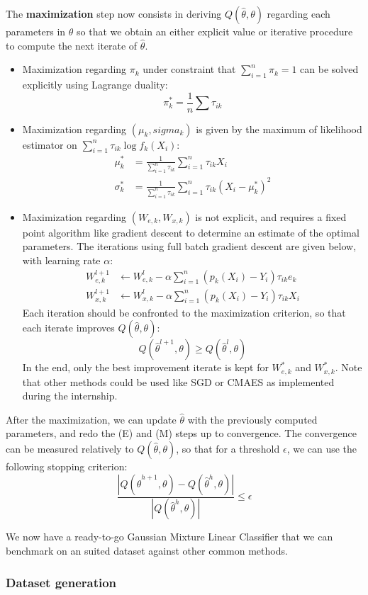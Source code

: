 The \textbf{maximization} step now consists in deriving $Q(\widehat{\theta}, \theta)$ regarding each parameters in $\theta$
so that we obtain an either explicit value or iterative procedure to compute the next iterate of $\widehat{\theta}$.
\begin{itemize}
    \item Maximization regarding $\pi_k$ under constraint that $\sum_{i=1}^n \pi_k = 1$ can be solved explicitly using Lagrange duality:
          $$
          \pi_k^* = \frac{1}{n} \sum \tau_{ik}
          $$
    \item Maximization regarding $(\mu_k, sigma_k)$ is given by the maximum of likelihood estimator on $\sum_{i=1}^n \tau_{ik} \log f_{k}(X_i)$:
          $$
          \begin{align}
              \mu_k^* &= \frac{1}{\sum_{i=1}^n \tau_{ik}} \sum_{i=1}^n \tau_{ik} X_i \\
              \sigma_k^* &= \frac{1}{\sum_{i=1}^n \tau_{ik}} \sum_{i=1}^n \tau_{ik} (X_i - \mu_k^*)^2
          \end{align}
          $$
    \item Maximization regarding $(W_{e,k}, W_{x,k})$ is not explicit, and requires a fixed point algorithm like gradient descent to determine an estimate of the optimal parameters.
          The iterations using full batch gradient descent are given below, with learning rate $\alpha$:
            $$
            \begin{align}
                W_{e,k}^{l+1} &\leftarrow W_{e,k}^{l} - \alpha \sum_{i=1}^n (p_k(X_i) - Y_i) \tau_{ik} e_k \\
                W_{x,k}^{l+1} &\leftarrow  W_{x,k}^{l} - \alpha \sum_{i=1}^n (p_k(X_i) - Y_i) \tau_{ik} X_i
            \end{align}
            $$
          Each iteration should be confronted to the maximization criterion, so that each iterate improves $Q(\widehat{\theta}, \theta)$:
          $$
          Q(\widehat{\theta}^{l+1}, \theta) \geq Q(\widehat{\theta}^{l}, \theta)
          $$
          In the end, only the best improvement iterate is kept for $W_{e,k}^*$ and $W_{x,k}^*$. Note that other methods could be used like SGD or CMAES as implemented during the internship.
\end{itemize}

After the maximization, we can update $\widehat{\theta}$ with the previously computed parameters, and redo the (E) and (M) steps up to convergence.
The convergence can be measured relatively to $ Q(\widehat{\theta}, \theta)$, so that for a threshold $\epsilon$, we can use the following stopping criterion:
$$
\frac{|Q(\widehat{\theta}^{h+1}, \theta) - Q(\widehat{\theta}^{h}, \theta)|}{|Q(\widehat{\theta}^{h}, \theta)|} \leq \epsilon
$$

We now have a ready-to-go Gaussian Mixture Linear Classifier that we can benchmark on an suited dataset against other common methods.

\subsubsection{Dataset generation}